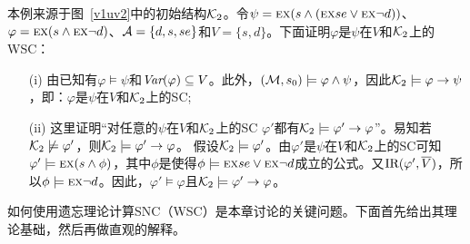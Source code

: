 \begin{example}\label{examp:WSC}
	本例来源于图~\ref{v1uv2}中的初始结构${\cal K}_2$。令$\psi = \textsc{e} \textsc{x}(s \wedge (\textsc{e} \textsc{x} se \vee \textsc{e} \textsc{x} \neg d))$、$\varphi = \textsc{e} \textsc{x}(s \wedge \textsc{e} \textsc{x} \neg d)$、${\cal A} =\{d, s, se\}$和$V = \{s, d\}$。下面证明$\varphi$是$\psi$在$V$和${\cal K}_2$上的WSC：
	\begin{itemize}
		\item[(i)] 由已知有$\varphi \models \psi$和$\textit{Var}(\varphi) \subseteq V$。此外，$({\cal M}, s_0) \models \varphi \wedge \psi$，因此${\cal K}_2 \models \varphi \rightarrow \psi$，即：$\varphi$是$\psi$在$V$和${\cal K}_2$上的SC;
		\item[(ii)] 这里证明“对任意的$\psi$在$V$和${\cal K}_2$上的SC $\varphi'$都有${\cal K}_2 \models \varphi' \rightarrow \varphi$”。易知若${\cal K}_2 \not \models \varphi'$，则${\cal K}_2\models \varphi' \rightarrow \varphi$。
		假设${\cal K}_2 \models \varphi'$。由$\varphi'$是$\psi$在$V$和${\cal K}_2$上的SC可知$\varphi' \models \textsc{e} \textsc{x}(s \wedge \phi)$，其中$\phi$是使得$\phi\models \textsc{e} \textsc{x} se \vee \textsc{e} \textsc{x} \neg d$成立的公式。又$\textrm{IR}(\varphi', \overline V)$，所以$\phi \models \textsc{e} \textsc{x} \neg d$。因此，$\varphi' \models \varphi$且${\cal K}_2 \models \varphi' \rightarrow \varphi$。
	\end{itemize}
\end{example}


如何使用遗忘理论计算SNC（WSC）是本章讨论的关键问题。下面首先给出其理论基础，然后再做直观的解释。

